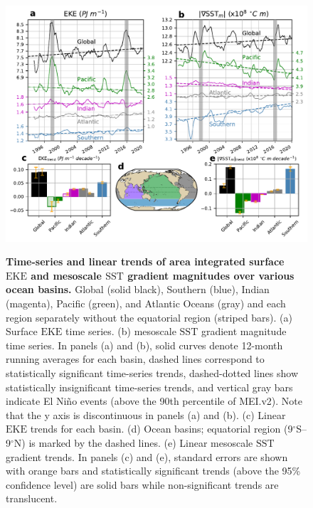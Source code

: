 \documentclass{nature}
\newcommand{\EKE}{\text{EKE}}
\newcommand{\SST}{\text{SST}}
\begin{document}
\begin{figure}
    \centering
	\includegraphics[width=1\textwidth]{./figures/global_basin_trends_FV.pdf}\\
	\caption{\textbf{Time-series and linear trends of area integrated surface $\EKE$ and mesoscale $\SST$ gradient magnitudes over various ocean basins.} Global (solid black), Southern (blue), Indian (magenta), Pacific (green), and Atlantic Oceans (gray) and each region separately without the equatorial region (striped bars). (a) Surface $\EKE$  time series. (b) mesoscale $\SST$ gradient magnitude time series. In panels (a) and (b), solid curves denote 12-month running averages for each basin, dashed lines correspond to statistically significant time-series trends, dashed-dotted lines show statistically insignificant time-series trends, and vertical gray bars indicate El Ni\~no events (above the 90th percentile of MEI.v2\cite{Wolter_ENSO_1998}). Note that the y axis is discontinuous in panels (a) and (b). (c) Linear $\EKE$ trends for each basin. (d) Ocean basins; equatorial region (9$^\circ$S--9$^\circ$N) is marked by the dashed lines. (e) Linear mesoscale $\SST$ gradient trends. In panels (c) and (e), standard errors are shown with orange bars and statistically significant trends (above the 95\% confidence level) are solid bars while non-significant trends are translucent. \label{fig:basin_trends}}
\end{figure}
\end{document}
